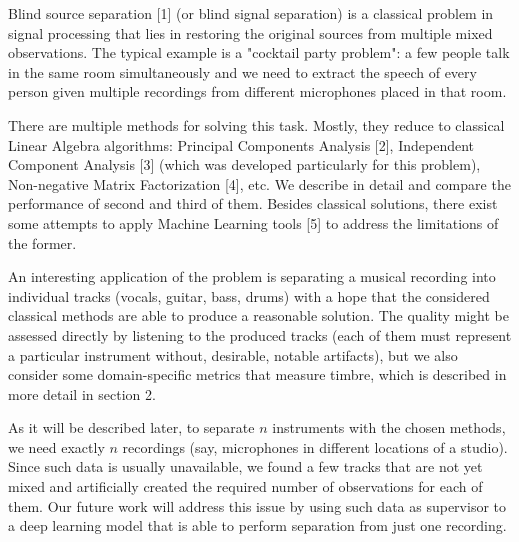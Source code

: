 \documentclass[../main.tex]{subfiles} %
\begin{document}

Blind source separation [1] (or blind signal separation) is a classical problem in signal processing that lies in restoring the original sources from multiple mixed observations. The typical example is a "cocktail party problem": a few people talk in the same room simultaneously and we need to extract the speech of every person given multiple recordings from different microphones placed in that room.

There are multiple methods for solving this task. Mostly, they reduce to classical Linear Algebra algorithms: Principal Components Analysis [2], Independent Component Analysis [3] (which was developed particularly for this problem), Non-negative Matrix Factorization [4], etc. We describe in detail and compare the performance of second and third of them. Besides classical solutions, there exist some attempts to apply Machine Learning tools [5] to address the limitations of the former.


An interesting application of the problem is separating a musical recording into individual tracks (vocals, guitar, bass, drums) with a hope that the considered classical methods are able to produce a reasonable solution. The quality might be assessed directly by listening to the produced tracks (each of them must represent a particular instrument without, desirable, notable artifacts), but we also consider some domain-specific metrics that measure timbre, which is described in more detail in section 2. 


As it will be described later, to separate $n$ instruments with the chosen methods, we need exactly $n$ recordings (say, microphones in different locations of a studio). Since such data is usually unavailable, we found a few tracks that are not yet mixed and artificially created the required number of observations for each of them. Our future work will address this issue by using such data as supervisor to a deep learning model that is able to perform separation from just one recording.
 
\end{document}
